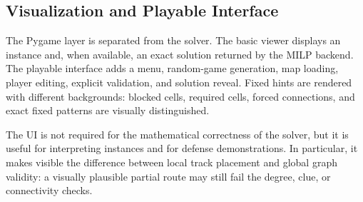 \subsection{Visualization and Playable Interface}

The Pygame layer is separated from the solver. The basic viewer displays an
instance and, when available, an exact solution returned by the MILP backend.
The playable interface adds a menu, random-game generation, map loading,
player editing, explicit validation, and solution reveal. Fixed hints are
rendered with different backgrounds: blocked cells, required cells, forced
connections, and exact fixed patterns are visually distinguished.

The UI is not required for the mathematical correctness of the solver, but it
is useful for interpreting instances and for defense demonstrations. In
particular, it makes visible the difference between local track placement and
global graph validity: a visually plausible partial route may still fail the
degree, clue, or connectivity checks.
